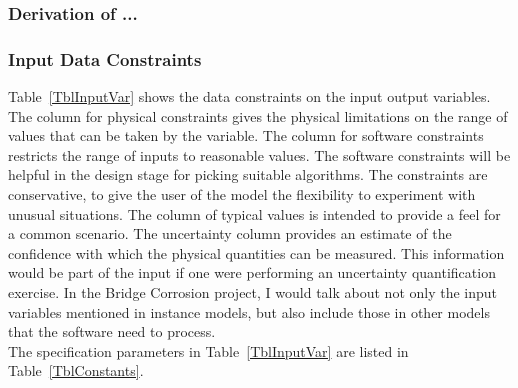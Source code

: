 \documentclass[12pt]{article}
\begin{document}

\subsubsection*{Derivation of ...}


\subsubsection{Input Data Constraints} \label{sec_DataConstraints}    

Table~\ref{TblInputVar} shows the data constraints on the input output
variables.  The column for physical constraints gives the physical limitations
on the range of values that can be taken by the variable.  The column for
software constraints restricts the range of inputs to reasonable values.  The
software constraints will be helpful in the design stage for picking suitable
algorithms.  The constraints are conservative, to give the user of the model the
flexibility to experiment with unusual situations.  The column of typical values
is intended to provide a feel for a common scenario.  The uncertainty column
provides an estimate of the confidence with which the physical quantities can be
measured.  This information would be part of the input if one were performing an
uncertainty quantification exercise. In the Bridge Corrosion project, I would talk about not only the input variables mentioned in instance models, but also include those in other models that the software need to process.\\
The specification parameters in Table~\ref{TblInputVar} are listed in
Table~\ref{TblConstants}.
\end{document}
